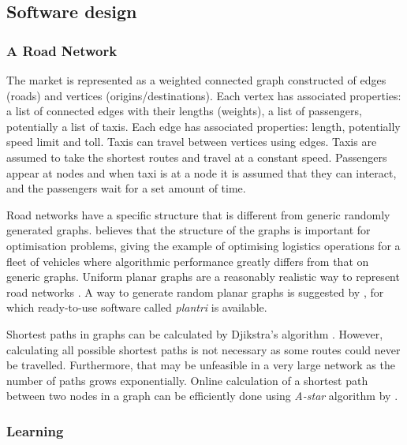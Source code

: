 \subsection{Software design}

\subsubsection{A Road Network}
\label{sec:design:software:network}

The market is represented as a weighted connected graph constructed of edges
(roads) and vertices (origins/destinations). Each vertex has associated
properties: a list of connected edges with their lengths (weights), a list of
passengers, potentially a list of taxis. Each edge has associated properties:
length, potentially speed limit and toll. Taxis can travel between vertices
using edges. Taxis are assumed to take the shortest routes and travel at a
constant speed. Passengers appear at nodes and when taxi is at a node it is
assumed that they can interact, and the passengers wait for a set amount of
time.

Road networks have a specific structure that is different from generic randomly
generated graphs. \textcite{Eisenstat2011graphs+quadtree} believes that the
structure of the graphs is important for optimisation problems, giving the
example of optimising logistics operations for a fleet of vehicles where
algorithmic performance greatly differs from that on generic graphs. Uniform
planar graphs are a reasonably realistic way to represent road networks
\parencite{Eisenstat2011graphs+quadtree, Masucci2009graphs+london}. A way to
generate random planar graphs is suggested by
\textcite{Brinkmann2007graphs+generate}, for which ready-to-use software called
\textit{plantri} is available. 

Shortest paths in graphs can be calculated by Djikstra's algorithm
\parencite{Cormen2009algorithms}. However, calculating all possible shortest
paths is not necessary as some routes could never be travelled. Furthermore,
that may be unfeasible in a very large network as the number of paths grows
exponentially. Online calculation of a shortest path between two nodes in a
graph can be efficiently done using \textit{A-star} algorithm by
\textcite{Hart1968paths}.


\subsubsection{Learning}
\label{sec:design:software:ai}

